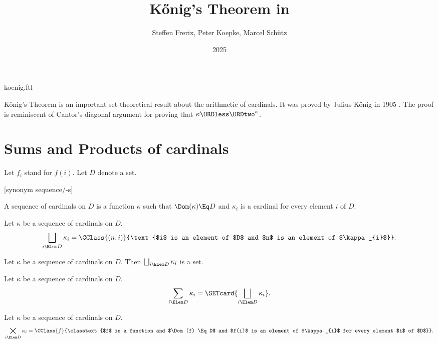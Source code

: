 \documentclass{stex}
\title{Kőnig's Theorem in \Naproche}
\author{Steffen Frerix, Peter Koepke, Marcel Schütz}
\date{2025}
\newcommand{\SumSet}[2]{\bigsqcup_{i \Elem #2} #1_{i}}
\newcommand{\Sum}[2]{\sum_{i \Elem #2} #1_{i}}
\newcommand{\ProdSet}[2]{\bigtimes_{i \Elem #2} #1_{i}}
\begin{document}
\begin{smodule}{koenig.ftl}

\maketitle



\noindent Kőnig's Theorem is an important set-theoretical result about the
arithmetic of cardinals.
It was proved by Julius Kőnig in 1905 \cite[p. 177--180]{Koenig1905}.
The proof is reminiscent of Cantor's diagonal argument for proving that
$\kappa \ORDless \ORDtwo^\kappa$.


\section*{Sums and Products of cardinals}

\begin{forthel}
  Let $f_{i}$ stand for $f(i)$.
  Let $D$ denote a set.

  [synonym sequence/-s]

  \begin{definition*}
    A sequence of cardinals on $D$ is a function $\kappa$ such that
    $\Dom(\kappa) \Eq D$ and $\kappa_{i}$ is a cardinal for every element $i$ of $D$.
  \end{definition*}

  \begin{definition*}
    Let $\kappa$ be a sequence of cardinals on $D$.
    \[ \SumSet{\kappa}{D} = \CClass{(n,i)}{\text{$i$ is an element of $D$ and $n$ is an element of $\kappa_{i}$}}. \]
  \end{definition*}

  \begin{axiom*}
    Let $\kappa$ be a sequence of cardinals on $D$.
    Then $\SumSet{\kappa}{D}$ is a set.
  \end{axiom*}

  \begin{definition*}
    Let $\kappa$ be a sequence of cardinals on $D$.
    \[ \Sum{\kappa}{D} = \SETcard{ \SumSet{\kappa}{D} }. \]
  \end{definition*}

  \begin{definition*}
    Let $\kappa$ be a sequence of cardinals on $D$.
    \[ \ProdSet{\kappa}{D} = \CClass{f}{\classtext{$f$ is a function and $\Dom(f) \Eq D$ and $f(i)$ is an element of $\kappa_{i}$ for every element $i$ of $D$}}. \]
  \end{definition*}


\end{forthel}
\end{smodule}
\end{document}
